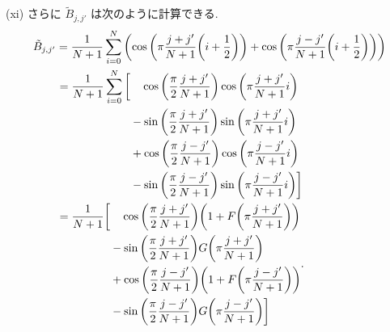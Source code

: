 \documentclass[uplatex,dvipdfmx,a4paper,11pt]{jlreq}
\theoremstyle{definition}
\begin{document}
(xi) さらに $\tilde{B}_{j,j'}$ は次のように計算できる.
\begin{align}
  \tilde{B}_{j,j'} & = \frac{1}{N+1}\sum_{i=0}^{N}\qty(\cos\qty(\pi\frac{j + j'}{N+1}\qty(i + \frac{1}{2})) + \cos\qty(\pi\frac{j - j'}{N+1}\qty(i + \frac{1}{2}))) \\
                   & \ \begin{aligned}
                         = \frac{1}{N+1}\sum_{i=0}^{N}\bigg[ & \quad\cos\qty(\frac{\pi}{2}\frac{j + j'}{N+1})\cos\qty(\pi\frac{j + j'}{N+1}i)    \\
                                                             & - \sin\qty(\frac{\pi}{2}\frac{j + j'}{N+1})\sin\qty(\pi\frac{j + j'}{N+1}i)       \\
                                                             & + \cos\qty(\frac{\pi}{2}\frac{j - j'}{N+1})\cos\qty(\pi\frac{j - j'}{N+1}i)       \\
                                                             & - \sin\qty(\frac{\pi}{2}\frac{j - j'}{N+1})\sin\qty(\pi\frac{j - j'}{N+1}i)\bigg]
                       \end{aligned}                                         \\
                   & \ \begin{aligned}
                         = \frac{1}{N+1}\bigg[ & \quad\cos\qty(\frac{\pi}{2}\frac{j + j'}{N+1})\qty(1 + F\qty(\pi\frac{j + j'}{N+1})) \\
                                               & - \sin\qty(\frac{\pi}{2}\frac{j + j'}{N+1})G\qty(\pi\frac{j + j'}{N+1})              \\
                                               & + \cos\qty(\frac{\pi}{2}\frac{j - j'}{N+1})\qty(1 + F\qty(\pi\frac{j - j'}{N+1}))    \\
                                               & - \sin\qty(\frac{\pi}{2}\frac{j - j'}{N+1})G\qty(\pi\frac{j - j'}{N+1})\bigg]
                       \end{aligned}.
\end{align}
\end{document}
